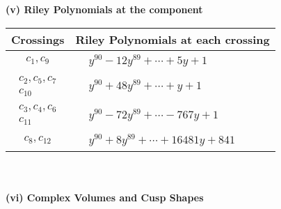 \documentclass[1p]{elsarticle_modified}
\theoremstyle{definition}
\begin{document}
\newpage\renewcommand{\arraystretch}{1}
\flushleft \textbf{(v) Riley Polynomials at the component}\newline \\
\begin{tabular}{m{50pt}|m{274pt}}
Crossings & \hspace{64pt}Riley Polynomials at each crossing \\
\hline $$\begin{aligned}c_{1},c_{9}\end{aligned}$$&$\begin{aligned}
&y^{90}-12 y^{89}+\cdots+5 y+1
\end{aligned}$\\
\hline $$\begin{aligned}c_{2},c_{5},c_{7}\\c_{10}\end{aligned}$$&$\begin{aligned}
&y^{90}+48 y^{89}+\cdots+y+1
\end{aligned}$\\
\hline $$\begin{aligned}c_{3},c_{4},c_{6}\\c_{11}\end{aligned}$$&$\begin{aligned}
&y^{90}-72 y^{89}+\cdots-767 y+1
\end{aligned}$\\
\hline $$\begin{aligned}c_{8},c_{12}\end{aligned}$$&$\begin{aligned}
&y^{90}+8 y^{89}+\cdots+16481 y+841
\end{aligned}$\\
\hline
\end{tabular}\\~\\
\newpage\flushleft \textbf{(vi) Complex Volumes and Cusp Shapes}
\end{document}
